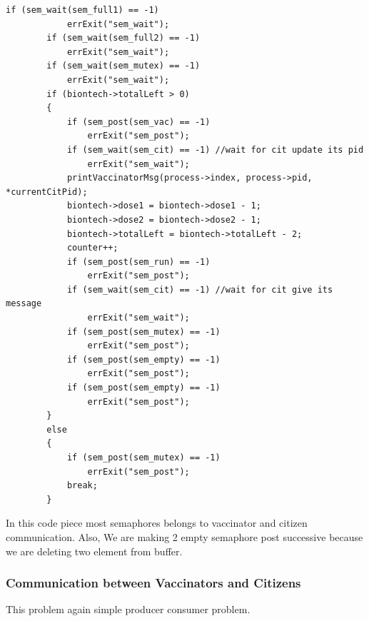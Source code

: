 \documentclass{article}
\begin{document}
\begin{lstlisting}[style=CStyle]
        if (sem_wait(sem_full1) == -1)
            errExit("sem_wait");
        if (sem_wait(sem_full2) == -1)
            errExit("sem_wait");
        if (sem_wait(sem_mutex) == -1)
            errExit("sem_wait");
        if (biontech->totalLeft > 0)
        {
            if (sem_post(sem_vac) == -1)
                errExit("sem_post");
            if (sem_wait(sem_cit) == -1) //wait for cit update its pid
                errExit("sem_wait");
            printVaccinatorMsg(process->index, process->pid, *currentCitPid);
            biontech->dose1 = biontech->dose1 - 1;
            biontech->dose2 = biontech->dose2 - 1;
            biontech->totalLeft = biontech->totalLeft - 2;
            counter++;
            if (sem_post(sem_run) == -1)
                errExit("sem_post");
            if (sem_wait(sem_cit) == -1) //wait for cit give its message
                errExit("sem_wait");
            if (sem_post(sem_mutex) == -1)
                errExit("sem_post");
            if (sem_post(sem_empty) == -1)
                errExit("sem_post");
            if (sem_post(sem_empty) == -1)
                errExit("sem_post");
        }
        else
        {
            if (sem_post(sem_mutex) == -1)
                errExit("sem_post");
            break;
        }
\end{lstlisting}
In this code piece most semaphores belongs to vaccinator and citizen communication.
Also, We are making 2 empty semaphore post successive because we are deleting two element from buffer.
\subsubsection{Communication between Vaccinators and Citizens}
This problem again simple producer consumer problem.
\end{document}
